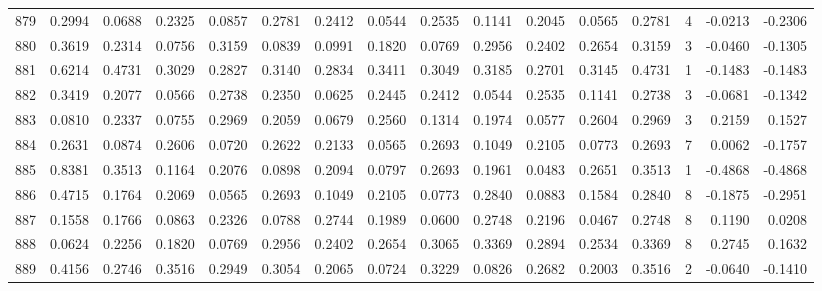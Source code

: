 \begin{tabular}{lrrrrrrrrrrrrrrr}
879 &      0.2994 &  0.0688 &  0.2325 &  0.0857 &  0.2781 &  0.2412 &  0.0544 &  0.2535 &  0.1141 &  0.2045 &   0.0565 &     0.2781 &      4 &                   -0.0213 &                    -0.2306 \\
880 &      0.3619 &  0.2314 &  0.0756 &  0.3159 &  0.0839 &  0.0991 &  0.1820 &  0.0769 &  0.2956 &  0.2402 &   0.2654 &     0.3159 &      3 &                   -0.0460 &                    -0.1305 \\
881 &      0.6214 &  0.4731 &  0.3029 &  0.2827 &  0.3140 &  0.2834 &  0.3411 &  0.3049 &  0.3185 &  0.2701 &   0.3145 &     0.4731 &      1 &                   -0.1483 &                    -0.1483 \\
882 &      0.3419 &  0.2077 &  0.0566 &  0.2738 &  0.2350 &  0.0625 &  0.2445 &  0.2412 &  0.0544 &  0.2535 &   0.1141 &     0.2738 &      3 &                   -0.0681 &                    -0.1342 \\
883 &      0.0810 &  0.2337 &  0.0755 &  0.2969 &  0.2059 &  0.0679 &  0.2560 &  0.1314 &  0.1974 &  0.0577 &   0.2604 &     0.2969 &      3 &                    0.2159 &                     0.1527 \\
884 &      0.2631 &  0.0874 &  0.2606 &  0.0720 &  0.2622 &  0.2133 &  0.0565 &  0.2693 &  0.1049 &  0.2105 &   0.0773 &     0.2693 &      7 &                    0.0062 &                    -0.1757 \\
885 &      0.8381 &  0.3513 &  0.1164 &  0.2076 &  0.0898 &  0.2094 &  0.0797 &  0.2693 &  0.1961 &  0.0483 &   0.2651 &     0.3513 &      1 &                   -0.4868 &                    -0.4868 \\
886 &      0.4715 &  0.1764 &  0.2069 &  0.0565 &  0.2693 &  0.1049 &  0.2105 &  0.0773 &  0.2840 &  0.0883 &   0.1584 &     0.2840 &      8 &                   -0.1875 &                    -0.2951 \\
887 &      0.1558 &  0.1766 &  0.0863 &  0.2326 &  0.0788 &  0.2744 &  0.1989 &  0.0600 &  0.2748 &  0.2196 &   0.0467 &     0.2748 &      8 &                    0.1190 &                     0.0208 \\
888 &      0.0624 &  0.2256 &  0.1820 &  0.0769 &  0.2956 &  0.2402 &  0.2654 &  0.3065 &  0.3369 &  0.2894 &   0.2534 &     0.3369 &      8 &                    0.2745 &                     0.1632 \\
889 &      0.4156 &  0.2746 &  0.3516 &  0.2949 &  0.3054 &  0.2065 &  0.0724 &  0.3229 &  0.0826 &  0.2682 &   0.2003 &     0.3516 &      2 &                   -0.0640 &                    -0.1410 \\

\end{tabular}
